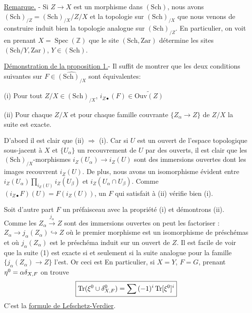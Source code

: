 \uline{Remarque.} - Si $Z\longrightarrow X$ est un morphisme dans $(\mathrm{Sch})$, nous avons $(\mathrm{Sch})_{/Z}=(\mathrm{Sch})_{/X}\big/ Z/X$ et la topologie sur $(\mathrm{Sch})_{/X}$ que nous venons de construire induit bien la topologie analogue sur $(\mathrm{Sch})_{/Z}$. En particulier, on voit en prenant $X=\operatorname{Spec}(\mathbb{Z})$ que le site $(\mathrm{Sch},\mathrm{Zar})$ détermine les sites $(\mathrm{Sch}/Y,\mathrm{Zar})$, $Y\in(\mathrm{Sch})$.

\uline{Démonstration de la proposition 1.}- Il suffit de montrer que les deux conditions suivantes sur $F\in\widehat{(\mathrm{Sch})_{/X}}$ sont équivalentes:

(i) Pour tout $Z/X\in(\mathrm{Sch})_{/X}$, $i_{Z\bullet}(F)\in\widetilde{\mathrm{Ouv}(Z)}$

(ii) Pour chaque $Z/X$ et pour chaque famille couvrante $\{Z_\alpha\longrightarrow Z\}$ de $Z/X$ la suite
est exacte.

D'abord il est clair que (ii) $\Longrightarrow$ (i). Car si $U$ est un ouvert de l'espace topologique sous-jacent à $X$ et $\{U_\alpha\}$ un recouvrement de $U$ par des ouverts, il est clair que les $(\mathrm{Sch})_{/X}$-morphismes $i_Z(U_\alpha)\longrightarrow i_Z(U)$ sont des immersions ouvertes dont les images recouvrent $i_Z(U)$. De plus, nous avons un isomorphisme évident entre $i_Z(U_\alpha)\mathop{\prod}\limits_{i_Z(U)} i_Z(U_\beta)$ et $i_Z(U_\alpha\cap U_\beta)$. Comme $(i_{Z\bullet}F)(U)=F(i_Z(U))$, un $F$ qui satisfait à (ii) vérifie bien (i).

Soit d'autre part $F$ un préfaisceau avec la propriété (i) et démontrons (ii). Comme les $Z_\alpha\xrightarrow{j_\alpha}Z$ sont des immersions ouvertes on peut les factoriser : $Z_\alpha\longrightarrow j_\alpha(Z_\alpha)\hookrightarrow Z$ où le premier morphisme est un isomorphisme de préschémas et où $j_\alpha(Z_\alpha)$ est le préschéma induit sur un ouvert de $Z$. Il est facile de voir que la suite (1) est exacte si et seulement si la suite analogue pour la famille $\{j_\alpha(Z_\alpha)\longrightarrow Z\}$ l'est. Or ceci est
En particulier, si $X=Y$, $F=G$, prenant $\eta^0={{\alpha}}\delta_{X,F}$ on trouve
\[
\boxed{\operatorname{Tr}(\xi^0\cup\delta_{X,F}^{0})=\sum{(-1)^i}\operatorname{Tr}[\xi^0]^i}
\]
C'est la \uline{formule de Lefschetz-Verdier}.

